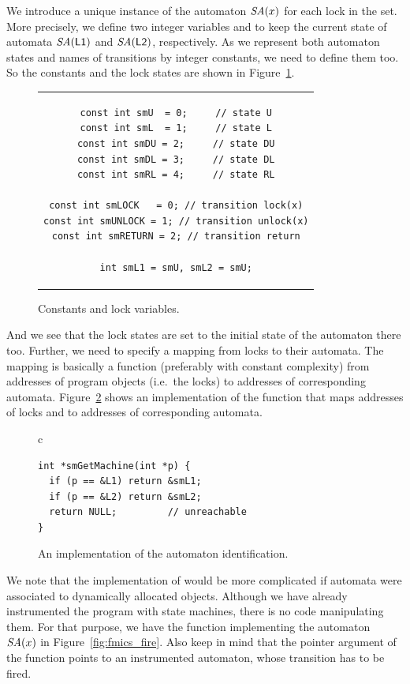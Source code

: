 We introduce a unique instance of the automaton ${\textit{SA}}(x)$ for each lock in the
set. More precisely, we define two integer variables  and
 to keep the current state of automata ${\textit{SA}}(\mathsf{L1})$ and
${\textit{SA}}(\mathsf{L2})$, respectively. As we represent both automaton states and names
of transitions by integer constants, we need to define them too. So the
constants and the lock states are shown in Figure~\ref{fig:fmics_const}.
\begin{figure}[htb]
  \begin{center}
  \begin{tabular}{c}
    \begin{lstlisting}[name=fmics_impl]
const int smU  = 0;     // state U
const int smL  = 1;     // state L
const int smDU = 2;     // state DU
const int smDL = 3;     // state DL
const int smRL = 4;     // state RL

const int smLOCK   = 0; // transition lock(x)
const int smUNLOCK = 1; // transition unlock(x)
const int smRETURN = 2; // transition return

int smL1 = smU, smL2 = smU;
    \end{lstlisting}
  \end{tabular}
  \end{center}
  \caption{Constants and lock variables.}
  \label{fig:fmics_const}
\end{figure}
And we see that the lock states are set to the initial state of the automaton
there too.  Further, we need to specify a mapping from locks to their
automata. The mapping is basically a function (preferably with constant
complexity) from addresses of program objects (i.e.\ the locks) to addresses
of corresponding automata.  Figure~\ref{fig:fmics_getm} shows an
implementation of the function  that maps addresses of
locks  and  to addresses of corresponding automata.
\begin{figure}[htb]
  \begin{center}
  \begin{tabular}{c}
    \begin{lstlisting}[name=fmics_impl]
int *smGetMachine(int *p) {
  if (p == &L1) return &smL1;
  if (p == &L2) return &smL2;
  return NULL;         // unreachable
}
    \end{lstlisting}
  \end{tabular}
  \end{center}
  \caption{An implementation of the automaton identification.}
  \label{fig:fmics_getm}
\end{figure}
We note that the implementation of  would be more
complicated if automata were associated to dynamically allocated objects.
Although we have already instrumented the program with state machines, there
is no code manipulating them. For that purpose, we have the function
 implementing the automaton ${\textit{SA}}(x)$ in
Figure~\ref{fig:fmics_fire}.  Also keep in mind that the pointer argument
 of the function points to an instrumented automaton, whose
transition has to be fired.

